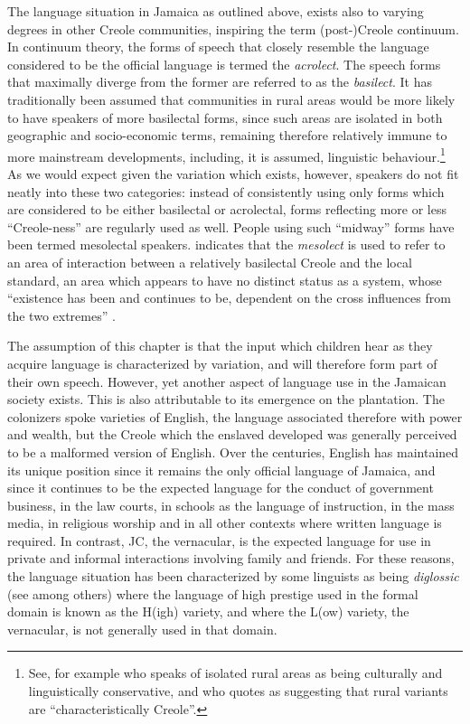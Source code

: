 \documentclass[output=paper,colorlinks,citecolor=brown]{langscibook}
\begin{document}
The language situation in Jamaica as outlined above, exists also to varying degrees in other Creole communities, inspiring the term (post-)Creole continuum. In continuum theory, the forms of speech that closely resemble the language considered to be the official language is termed the \textit{acrolect}. The speech forms that maximally diverge from the former are referred to as the  \textit{basilect}. It has traditionally been assumed that communities in rural areas would be more likely to have speakers of more basilectal forms, since such areas are isolated in both geographic and socio-economic terms, remaining therefore relatively immune to more mainstream developments, including, it is assumed, linguistic behaviour.\footnote{See, for example \citet[49]{patrick1999urban} who speaks of isolated rural areas as being culturally and linguistically conservative, and who quotes \citet[23]{Rickford1987} as suggesting that rural variants are “characteristically Creole”.} As we would expect given the variation which exists, however, speakers do not fit neatly into these two categories: instead of consistently using only forms which are considered to be either basilectal or acrolectal, forms reflecting more or less “Creole-ness” are regularly used as well. People using such “midway” forms have been termed mesolectal speakers. \citet[236]{Winford1997re-exam} indicates that the \textit{mesolect} is used to refer to an area of interaction between a relatively basilectal Creole and the local standard, an area which appears to have no distinct status as a system, whose “existence has been and continues to be, dependent on the cross influences from the two extremes” \citep[372]{Craig1971}.

The assumption of this chapter is that the input which children hear as they acquire language is characterized by variation, and will therefore form part of their own speech. However, yet another aspect of language use in the Jamaican society exists. This is also attributable to its emergence on the plantation. The colonizers spoke varieties of English, the language associated therefore with power and wealth, but the Creole which the enslaved developed was generally perceived to be a malformed version of English. Over the centuries, English has maintained its unique position since it remains the only official language of Jamaica, and since it continues to be the expected language for the conduct of government business, in the law courts, in schools as the language of instruction, in the mass media, in religious worship and in all other contexts where written language is required. In contrast, JC, the vernacular, is the expected language for use in private and informal interactions involving family and friends. For these reasons, the language situation has been characterized by some linguists as being \textit{diglossic} (see \citealt{Winford1985} among others) where the language of high prestige used in the formal domain is known as the H(igh) variety, and where the L(ow) variety, the vernacular, is not generally used in that domain.
\end{document}
